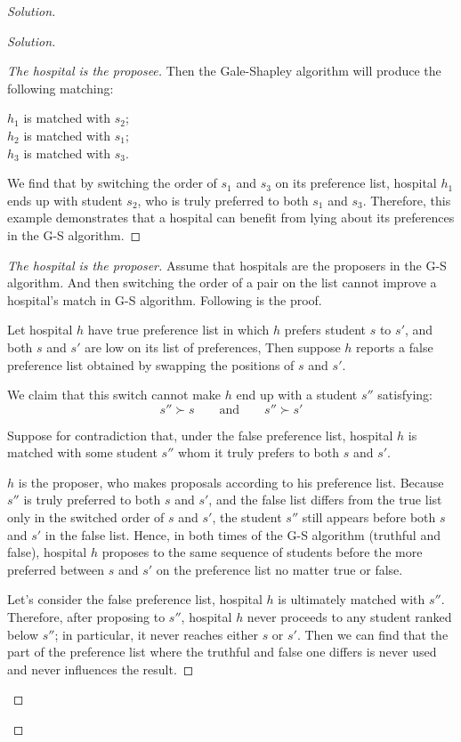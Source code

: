 \documentclass[12pt]{article}
\begin{document}
\begin{enumerate}[leftmargin=*]
\begin{proof}[Solution]
\begin{proof}[Solution]
\begin{proof}[The hospital is the proposee]
    Then the Gale-Shapley algorithm will produce the following matching:
    \begin{center}
        $h_1$ is matched with $s_2$;\\
        $h_2$ is matched with $s_1$;\\
        $h_3$ is matched with $s_3$.
    \end{center}

    We find that by switching the order of $s_1$ and $s_3$ on its preference list, hospital $h_1$ ends up with student $s_2$, who is truly preferred to both $s_1$ and $s_3$. Therefore, this example demonstrates that a hospital can benefit from lying about its preferences in the G-S algorithm.
\end{proof}

\begin{proof}[The hospital is the proposer]
    Assume that hospitals are the proposers in the G-S algorithm. And then switching the order of a pair on the list cannot improve a hospital's match in G-S algorithm.
    Following is the proof.

    Let hospital $h$ have true preference list in which $h$ prefers student $s$ to $s'$, and both $s$ and $s'$ are low on its list of preferences,
    Then suppose $h$ reports a false preference list obtained by swapping the positions of $s$ and $s'$.

    We claim that this switch cannot make $h$ end up with a student $s''$ satisfying:
    $$
    s'' \succ s
    \qquad\text{and}\qquad
    s'' \succ s'
    $$

    Suppose for contradiction that, under the false preference list, hospital $h$ is matched with some student $s''$ whom it truly prefers to both $s$ and $s'$.

    $h$ is the proposer, who makes proposals according to his preference list.
    Because $s''$ is truly preferred to both $s$ and $s'$, and the false list differs from the true list only in the switched order of $s$ and $s'$, the student $s''$ still appears before both $s$ and $s'$ in the false list.
    Hence, in both times of the G-S algorithm (truthful and false), hospital $h$ proposes to the same sequence of students before the more preferred between $s$ and $s'$ on the preference list no matter true or false.

    Let's consider the false preference list, hospital $h$ is ultimately matched with $s''$.
    Therefore, after proposing to $s''$, hospital $h$ never proceeds to any student ranked below $s''$; in particular, it never reaches either $s$ or $s'$.
    Then we can find that the part of the preference list where the truthful and false one differs is never used and never influences the result.


\end{proof}
\end{proof}
\end{proof}
\end{enumerate}
\end{document}
